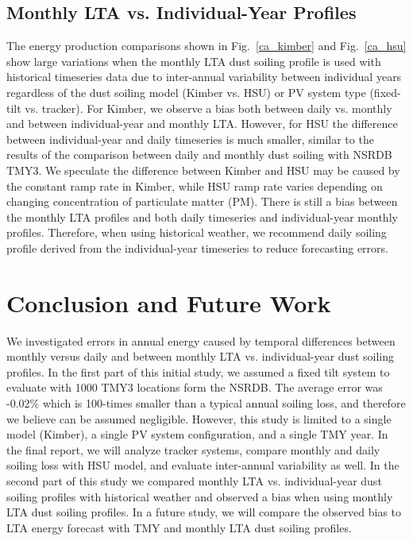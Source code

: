 \documentclass[conference]{IEEEtran}
\begin{document}
\subsection{Monthly LTA vs. Individual-Year Profiles}

The energy production comparisons shown in Fig.~\ref{ca_kimber} and Fig.~\ref{ca_hsu} show large variations when the monthly LTA dust soiling profile is used with historical timeseries data due to inter-annual variability between individual years regardless of the dust soiling model (Kimber vs. HSU) or PV system type (fixed-tilt vs. tracker). For Kimber, we observe a bias both between daily vs. monthly and between individual-year and monthly LTA. However, for HSU the difference between individual-year and daily timeseries is much smaller, similar to the results of the comparison between daily and monthly dust soiling with NSRDB TMY3. We speculate the difference between Kimber and HSU may be caused by the constant ramp rate in Kimber, while HSU ramp rate varies depending on changing concentration of particulate matter (PM). There is still a bias between the monthly LTA profiles and both daily timeseries and individual-year monthly profiles. Therefore, when using historical weather, we recommend daily soiling profile derived from the individual-year timeseries to reduce forecasting errors.

\balance
\section{Conclusion and Future Work}

We investigated errors in annual energy caused by temporal differences between monthly versus daily and between monthly LTA vs. individual-year dust soiling profiles. In the first part of this initial study, we assumed a fixed tilt system to evaluate with 1000 TMY3 locations form the NSRDB. The average error was -0.02\% which is 100-times smaller than a typical annual soiling loss, and therefore we believe can be assumed negligible. However, this study is limited to a single model (Kimber), a single PV system configuration, and a single TMY year. In the final report, we will analyze tracker systems, compare monthly and daily soiling loss with HSU model, and evaluate inter-annual variability as well. In the second part of this study we compared monthly LTA vs. individual-year dust soiling profiles with historical weather and observed a bias when using monthly LTA dust soiling profiles. In a future study, we will compare the observed bias to LTA energy forecast with TMY and monthly LTA dust soiling profiles.
\end{document}
